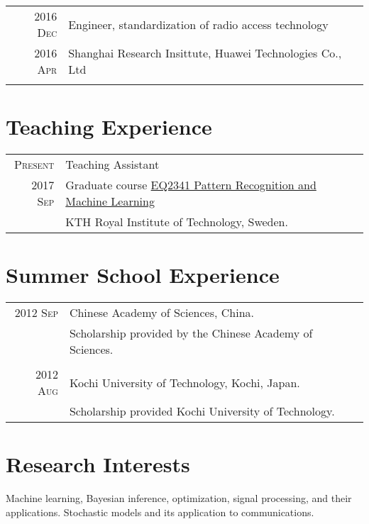 \documentclass[a4paper,10pt]{article}
\begin{document}
\begin{tabular}{r|p{13cm}}

  \textsc{2016 Dec}  & Engineer, standardization of radio access technology  \\
  \textsc{2016 Apr}  & Shanghai Research Insittute, Huawei Technologies Co., Ltd \\
  \multicolumn{2}{c}{} \\

\end{tabular}

\section{Teaching Experience}
\begin{tabular}{r|p{13cm}}

  \textsc{Present}  & Teaching Assistant \\
  \textsc{2017 Sep}  & Graduate course \href{https://www.kth.se/student/kurser/kurs/EQ2341?l=en}{EQ2341 Pattern Recognition and Machine Learning} \\
                    & KTH Royal Institute of Technology, Sweden.\\

\end{tabular}
\section{Summer School Experience}
\begin{tabular}{r|p{13cm}}

  \textsc{2012 Sep}  & Chinese Academy of Sciences, China. \\
                     & Scholarship provided by the Chinese Academy of Sciences. \\
  \multicolumn{2}{c}{}\\
  \textsc{2012 Aug}  & Kochi University of Technology, Kochi, Japan. \\
                     & Scholarship provided Kochi University of Technology.
\end{tabular}

\section{Research Interests}
Machine learning, Bayesian inference, optimization, signal processing, and their applications. Stochastic models and its application to communications.
\end{document}
